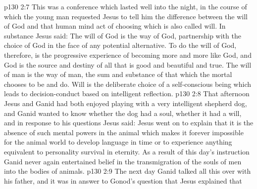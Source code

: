 \vs p130 2:7 This was a conference which lasted well into the night, in the course of which the young man requested Jesus to tell him the difference between the will of God and that human mind act of choosing which is also called will. In substance Jesus said: The will of God is the way of God, partnership with the choice of God in the face of any potential alternative. To do the will of God, therefore, is the progressive experience of becoming more and more like God, and God is the source and destiny of all that is good and beautiful and true. The will of man is the way of man, the sum and substance of that which the mortal chooses to be and do. Will is the deliberate choice of a self\hyp{}conscious being which leads to decision\hyp{}conduct based on intelligent reflection.
\vs p130 2:8 That afternoon Jesus and Ganid had both enjoyed playing with a very intelligent shepherd dog, and Ganid wanted to know whether the dog had a soul, whether it had a will, and in response to his questions Jesus said:  Jesus went on to explain that it is the absence of such mental powers in the animal which makes it forever impossible for the animal world to develop language in time or to experience anything equivalent to personality survival in eternity. As a result of this day’s instruction Ganid never again entertained belief in the transmigration of the souls of men into the bodies of animals.
\vs p130 2:9 \pc The next day Ganid talked all this over with his father, and it was in answer to Gonod’s question that Jesus explained that 
